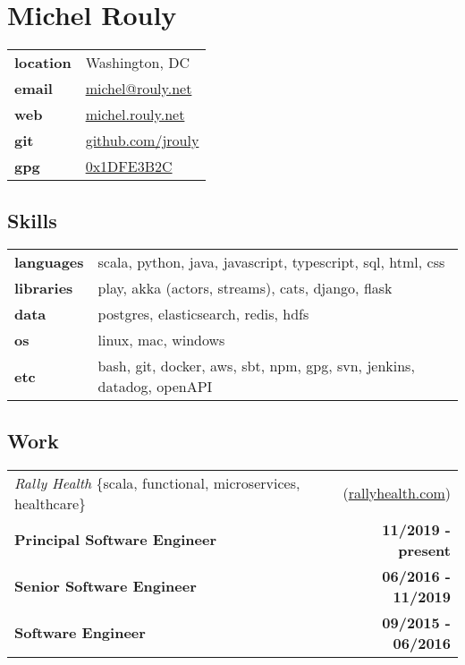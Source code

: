 \documentclass[10pt,letterpaper]{article}
\begin{document}
\setcounter{secnumdepth}{0}

\section{Michel Rouly}


\begin{tabularx}{\textwidth}{@{}lX@{}}
  \textbf{location} & Washington, DC \\
  \textbf{email} & \href{mailto:michel@rouly.net}{michel@rouly.net} \\
  \textbf{web} & \href{https://michel.rouly.net}{michel.rouly.net} \\
  \textbf{git} & \href{https://github.com/jrouly}{github.com/jrouly} \\
  \textbf{gpg} & \href{http://keys.gnupg.net/pks/lookup?op=get\&search=0x68E925EE1DFE3B2C}{0x1DFE3B2C}
\end{tabularx}


\subsection{Skills}

\noindent
\begin{tabularx}{\textwidth}{@{}lX@{}}
  \textbf{languages} & scala, python, java, javascript, typescript, sql, html, css \\
  \textbf{libraries} & play, akka (actors, streams), cats, django, flask \\
  \textbf{data} & postgres, elasticsearch, redis, hdfs \\
  \textbf{os} & linux, mac, windows \\
  \textbf{etc} & bash, git, docker, aws, sbt, npm, gpg, svn, jenkins, datadog, openAPI
\end{tabularx}


\subsection{Work}


\noindent\begin{tabularx}{\textwidth}{@{}X r@{}}
  \textit{Rally Health} \{scala, functional, microservices, healthcare\} & (\href{https://www.rallyhealth.com}{rallyhealth.com}) \\
  \textbf{Principal Software Engineer} & \textbf{11/2019 - present} \\
  \textbf{Senior Software Engineer} & \textbf{06/2016 - 11/2019} \\
  \textbf{Software Engineer} & \textbf{09/2015 - 06/2016} \\
\end{tabularx}
\end{document}
